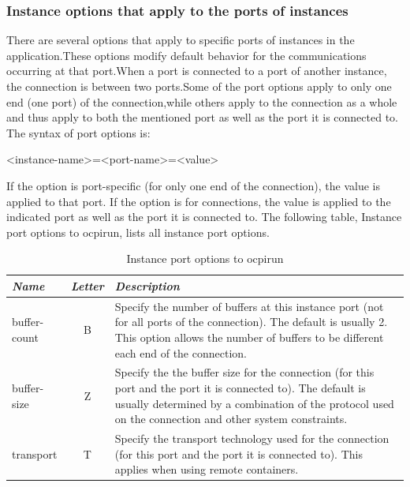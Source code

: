 \documentclass[10pt, a4paper, oneside]{article}
\renewcommand*{\arraystretch}{2.5}%
\renewcommand\_{\textunderscore\allowbreak} %
\begin{document}
{\subsubsection{Instance options that apply to the ports of instances} There are several options that apply to specific ports of instances in the application.These options modify default behavior for the communications occurring at that port.When a port is connected to a port of another instance, the connection is between two ports.Some of the port options apply to only one end (one port) of the connection,while others apply to the connection as a whole and thus apply to both the mentioned port as well as the port it is connected to. The syntax of port options is: \begin{ocpixml}
<instance-name>=<port-name>=<value> \end{ocpixml}
If the option is port-specific (for only one end of the connection), the value is applied to that port.  If the option is for connections, the value is applied to the indicated port as well as the port it is connected to. The following table, Instance port options to ocpirun, lists all instance port options.
\begin{table}[h!]
\caption{Instance port options to ocpirun}
\renewcommand*{\arraystretch}{2.5}
\begin{tabular}[c] {| l | c | p{12cm}|}
\hline
\emph{Name} & \emph{Letter} & \emph{Description}\\
\hline
 buffer-count & B & Specify the number of buffers at this instance port (not for all ports of the connection).  The default is usually 2.  This option allows the number of buffers to be different each end of the connection. \\ 
\hline  
buffer-size & Z	& Specify the the buffer size for the connection (for this port and the port it is connected to).  The default is usually determined by a combination of the protocol used on the connection and other system constraints.\\ 
\hline  
transport & T	& Specify the transport technology used for the connection (for this port and the port it is connected to).  This applies when using remote containers.\\ 
\hline
\end{tabular}
\end{table}
}
\end{document}
